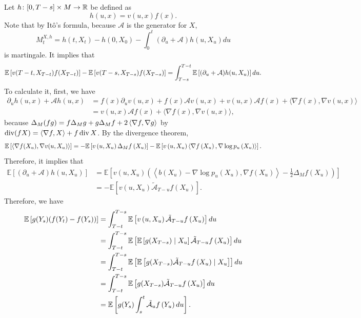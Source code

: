 Let $h \colon [0,T-s] \times M \rightarrow \mathbb{R}$ be defined as
\begin{equation*}
    h(u,x) = v(u,x)f(x).
\end{equation*}
Note that by It\^o's formula, because $\mathcal{A}$ is the generator for $X$,
\begin{equation*}
     M^{X,h}_t = h(t,X_t) - h(0,X_0) - \int_0^t (\partial_u + \mathcal{A})h(u,X_u)du
\end{equation*}
is martingale. It implies that
\begin{equation*}
    \mathbb{E}\left[v(T-t,X_{T-t})f(X_{T-t})\right]- \mathbb{E}\left[v(T-s,X_{T-s})f(X_{T-s})\right] = \int_{T-s}^{T-t}\mathbb{E}\left[(\partial_u + \mathcal{A})h(u,X_u)\right]du.
\end{equation*}
To calculate it, first, we have
\begin{align*}
    \partial_u h(u, x)+\mathcal{A} h(u, x)&=f(x) \partial_u v(u, x)+f(x) \mathcal{A} v(u, x)+v(u, x) \mathcal{A} f(x)+\langle\nabla f(x), \nabla v(u, x)\rangle \\
    &=v(u, x) \mathcal{A} f(x)+\langle\nabla f(x), \nabla v(u, x)\rangle,
\end{align*}
because $\Delta_M(fg) = f \Delta_Mg+g\Delta_Mf + 2\left\langle \nabla f, \nabla g \right\rangle$ by $\operatorname{div}(fX) = \left\langle \nabla f, X \right\rangle+f\operatorname{div}X$. By the divergence theorem,
\begin{equation*}
    \mathbb{E}\left[\langle\nabla f(X_u), \nabla v(u, X_u)\rangle\right] = -\mathbb{E}\left[v\left(u, X_u\right) \Delta_M f\left(X_u\right)\right]-\mathbb{E}\left[v\left(u, X_u\right)\left\langle\nabla f\left(X_u\right), \nabla \log p_u\left(X_u\right)\right\rangle\right] .
\end{equation*}
Therefore, it implies that
\begin{align*}
    \mathbb{E}\left[(\partial_u +\mathcal{A})h\left(u, X_u\right)\right] &= \mathbb{E}\left[v\left(u, X_u\right)\left(\left\langle b\left(X_u\right)-\nabla \log p_u\left(X_u\right), \nabla f\left(X_u\right)\right\rangle-\frac{1}{2} \Delta_{M} f\left(X_u\right)\right)\right] \\
    &= -\mathbb{E}\left[v\left(u, X_u\right) \tilde{\mathcal{A}}_{T-u}f\left(X_u\right)\right].
\end{align*}
Therefore, we have
\begin{align*}
    \mathbb{E}\left[g(Y_s)(f(Y_t)-f(Y_s))\right] &= \int_{T-t}^{T-s} \mathbb{E}\left[v\left(u, X_u\right) \tilde{\mathcal{A}}_{T-u}f\left(X_u\right)\right] du \\
    &=\int_{T-t}^{T-s} \mathbb{E}\left[\mathbb{E}\left[g(X_{T-s}) \mid X_u\right] \tilde{\mathcal{A}}_{T-u}f\left(X_u\right)\right] du \\
    &=\int_{T-t}^{T-s} \mathbb{E}\left[\mathbb{E}\left[g(X_{T-s})\tilde{\mathcal{A}}_{T-u}f\left(X_u\right) \mid X_u\right] \right] du \\
    &= \int_{T-t}^{T-s} \mathbb{E}\left[g(X_{T-s})\tilde{\mathcal{A}}_{T-u}f\left(X_u\right) \right] du \\
    &= \mathbb{E}\left[g(Y_s)\int_{s}^{t}\tilde{\mathcal{A}}_{u}f\left(Y_u\right) du\right].
\end{align*}

